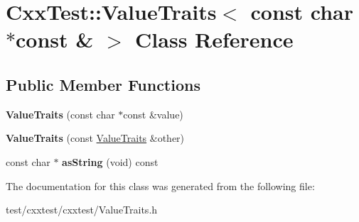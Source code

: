 \hypertarget{classCxxTest_1_1ValueTraits_3_01const_01char_01_5const_01_6_01_4}{\section{Cxx\-Test\-:\-:Value\-Traits$<$ const char $\ast$const \& $>$ Class Reference}
\label{classCxxTest_1_1ValueTraits_3_01const_01char_01_5const_01_6_01_4}
}
\subsection*{Public Member Functions}
\begin{DoxyCompactItemize}
\item 
\hypertarget{classCxxTest_1_1ValueTraits_3_01const_01char_01_5const_01_6_01_4_a938f406ac893d55ea301ac45afbe3db3}{{\bfseries Value\-Traits} (const char $\ast$const \&value)}\label{classCxxTest_1_1ValueTraits_3_01const_01char_01_5const_01_6_01_4_a938f406ac893d55ea301ac45afbe3db3}

\item 
\hypertarget{classCxxTest_1_1ValueTraits_3_01const_01char_01_5const_01_6_01_4_a937ec7ed8445207a50a67805bcb26ed5}{{\bfseries Value\-Traits} (const \hyperlink{classCxxTest_1_1ValueTraits}{Value\-Traits} \&other)}\label{classCxxTest_1_1ValueTraits_3_01const_01char_01_5const_01_6_01_4_a937ec7ed8445207a50a67805bcb26ed5}

\item 
\hypertarget{classCxxTest_1_1ValueTraits_3_01const_01char_01_5const_01_6_01_4_a85c04b397f3e1d9cb907c7fd3b9e33be}{const char $\ast$ {\bfseries as\-String} (void) const }\label{classCxxTest_1_1ValueTraits_3_01const_01char_01_5const_01_6_01_4_a85c04b397f3e1d9cb907c7fd3b9e33be}

\end{DoxyCompactItemize}


The documentation for this class was generated from the following file\-:\begin{DoxyCompactItemize}
\item 
test/cxxtest/cxxtest/Value\-Traits.\-h\end{DoxyCompactItemize}
